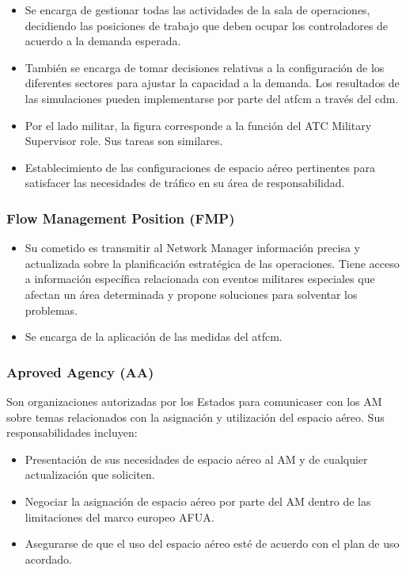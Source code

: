 \begin{itemize}
    \item Se encarga de gestionar todas las actividades de la sala de operaciones, decidiendo las posiciones de trabajo que deben ocupar los controladores de acuerdo a la demanda esperada.
    
    \item También se encarga de tomar decisiones relativas a la configuración de los diferentes sectores para ajustar la capacidad a la demanda. Los resultados de las simulaciones pueden implementarse por parte del \acrfull{atfcm} a través del \acrfull{cdm}.
    
    \item Por el lado militar, la figura corresponde a la función del ATC Military Supervisor role. Sus tareas son similares.
    
    \item Establecimiento de las configuraciones de espacio aéreo pertinentes para satisfacer las necesidades de tráfico en su área de responsabilidad.
\end{itemize}
 
\subsubsection{Flow Management Position (FMP)}

\begin{itemize}
    \item Su cometido es transmitir al Network Manager información precisa y actualizada sobre la planificación estratégica de las operaciones. Tiene acceso a información específica relacionada con eventos militares especiales que afectan un área determinada y propone soluciones para solventar los problemas.
    \item Se encarga de la aplicación de las medidas del \acrfull{atfcm}.
\end{itemize}    

\subsubsection{Aproved Agency (AA)}

Son organizaciones autorizadas por los Estados para comunicaser con los AM sobre temas relacionados con la asignación y utilización del espacio aéreo. Sus responsabilidades incluyen:

\begin{itemize}
    \item Presentación de sus necesidades de espacio aéreo al AM y de cualquier actualización que soliciten.
    \item Negociar la asignación de espacio aéreo por parte del AM dentro de las limitaciones del marco europeo AFUA.
    \item Asegurarse de que el uso del espacio aéreo esté de acuerdo con el plan de uso acordado.
\end{itemize}

